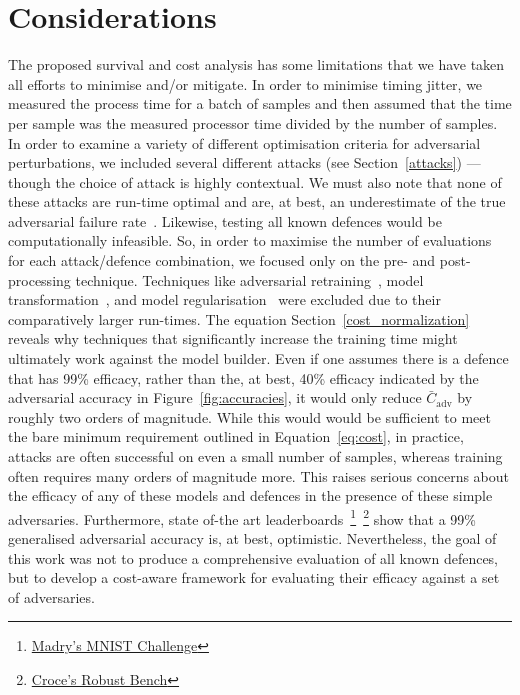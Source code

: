 \section{Considerations}
The proposed survival and cost analysis  has some limitations that we have taken all efforts to minimise and/or mitigate.
In order to minimise timing jitter, we measured the process time for a batch of samples and then assumed that the time per sample was the measured processor time divided by the number of samples.
In order to examine a variety of different optimisation criteria for adversarial perturbations, we included several different attacks (see Section~\ref{attacks}) --- though the choice of attack is highly contextual.
We must also note that none of these attacks are run-time optimal and are, at best, an underestimate of the true adversarial failure rate~\cite{meyers}.
Likewise, testing all known defences would be computationally infeasible. So, in order to maximise the number of evaluations for each attack/defence combination, we focused only on the pre- and post-processing technique.
Techniques like adversarial retraining~\cite{croce_reliable_2020}, model transformation~\cite{papernot_distillation_2016}, and model regularisation~\cite{jakubovitz2018improving} were excluded due to their comparatively larger run-times. The equation Section~\ref{cost_normalization} reveals why techniques that significantly increase the training time might ultimately work against the model builder.
Even if one assumes there is a defence that has 99\% efficacy, rather than the, at best, 40\% efficacy indicated by the adversarial accuracy in Figure~\ref{fig:accuracies}, it would only reduce $\bar{C}_{\mathrm{adv}}$ by roughly two orders of magnitude.
While this would would be sufficient to meet the bare minimum requirement outlined in Equation~\ref{eq:cost}, in practice, attacks are often successful on even a small number of samples, whereas training often requires many orders of magnitude more. This raises serious concerns about the efficacy of any of these models and defences in the presence of these simple adversaries.
Furthermore, state of-the art leaderboards~\footnote{\href{https://github.com/MadryLab/mnist\_challenge}{Madry's MNIST Challenge}}~\footnote{\href{https://ml.cs.tsinghua.edu.cn/adv\-bench/}{Croce's Robust Bench}}
show that a 99\% generalised adversarial accuracy is, at best, optimistic. Nevertheless, the goal of this work was not to produce a comprehensive evaluation of all known defences, but to develop a cost-aware framework for evaluating their efficacy against a set of adversaries.

